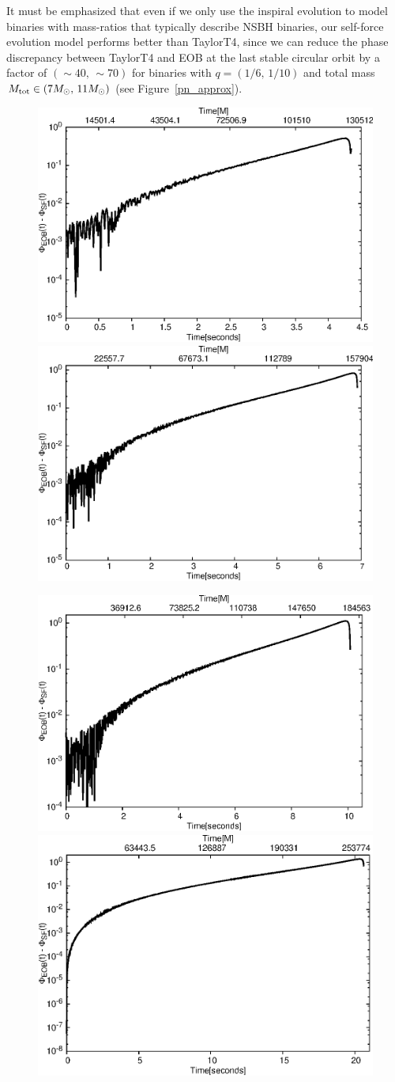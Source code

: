 It must be emphasized that even if we only use the inspiral evolution to model binaries with mass-ratios that typically describe NSBH binaries, our self-force evolution model performs better than TaylorT4, since we can reduce the phase discrepancy between TaylorT4 and EOB at the last stable circular orbit by a factor of \((\sim40, \, \sim70)\)  for binaries with \(q=(1/6,\,1/10)\)  and total mass \(M_{{\rm{tot}}}\in (7M_{\odot} ,\, 11M_{\odot} )\) (see Figure~\ref{pn_approx}).


 \begin{figure}[ht]
\centerline{
\includegraphics[height=0.35\textwidth,  clip]{figures/imrimri/phsiffeobsfm1m6.eps}
\includegraphics[height=0.35\textwidth,  clip]{figures/imrimri/phsiffeobsfm1m8.eps}
}
\centerline{
\includegraphics[height=0.35\textwidth,  clip]{figures/imrimri/phsiffeobsfm1m10.eps}
\includegraphics[height=0.35\textwidth,  clip]{figures/imrimri/phsiffeobsfm1m15.eps}
}
\end{figure}
